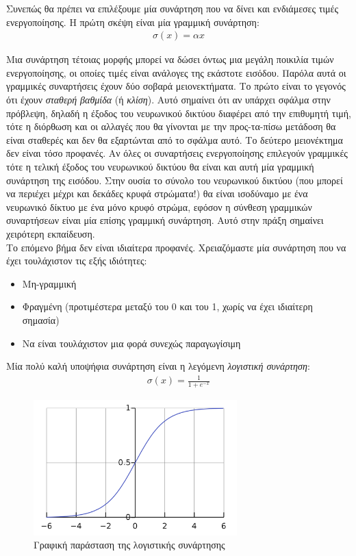 \documentclass[11pt]{article} %
\numberwithin{equation}{subsection}
\begin{document}
Συνεπώς θα πρέπει να επιλέξουμε μία συνάρτηση που να δίνει και ενδιάμεσες τιμές ενεργοποίησης. Η πρώτη σκέψη είναι μία γραμμική συνάρτηση:
\begin{align*}
\sigma (x) = \alpha x
\end{align*}

Μια συνάρτηση τέτοιας μορφής μπορεί να δώσει όντως μια μεγάλη ποικιλία τιμών ενεργοποίησης, οι οποίες τιμές είναι ανάλογες της εκάστοτε εισόδου. Παρόλα αυτά οι γραμμικές συναρτήσεις έχουν δύο σοβαρά μειονεκτήματα. Το πρώτο είναι το γεγονός ότι έχουν \textit{σταθερή βαθμίδα} (ή \textit{κλίση}). Αυτό σημαίνει ότι αν υπάρχει σφάλμα στην πρόβλεψη, δηλαδή η έξοδος του νευρωνικού δικτύου διαφέρει από την επιθυμητή τιμή, τότε η διόρθωση και οι αλλαγές που θα γίνονται με την προς-τα-πίσω μετάδοση θα είναι σταθερές και δεν θα εξαρτώνται από το σφάλμα αυτό. Το δεύτερο μειονέκτημα δεν είναι τόσο προφανές. Αν όλες οι συναρτήσεις ενεργοποίησης επιλεγούν γραμμικές τότε η τελική έξοδος του νευρωνικού δικτύου θα είναι και αυτή μία γραμμική συνάρτηση της εισόδου. Στην ουσία το σύνολο του νευρωνικού δικτύου (που μπορεί να περιέχει μέχρι και δεκάδες κρυφά στρώματα!) θα είναι ισοδύναμο με ένα νευρωνικό δίκτυο με ένα μόνο κρυφό στρώμα, εφόσον η σύνθεση γραμμικών συναρτήσεων είναι μία επίσης γραμμική συνάρτηση. Αυτό στην πράξη σημαίνει χειρότερη εκπαίδευση.\\

Το επόμενο βήμα δεν είναι ιδιαίτερα προφανές. Χρειαζόμαστε μία συνάρτηση που να έχει τουλάχιστον τις εξής ιδιότητες:
\begin{itemize}
  \item Μη-γραμμική
  \item Φραγμένη (προτιμέστερα μεταξύ του 0 και του 1, χωρίς να έχει ιδιαίτερη σημασία)
  \item Να είναι τουλάχιστον μια φορά συνεχώς παραγωγίσιμη 
\end{itemize}

Μία πολύ καλή υποψήφια συνάρτηση είναι η λεγόμενη \textit{λογιστική συνάρτηση}:
\begin{align*}
\sigma(x) = \frac{1}{1+e^{-x}}
\end{align*}

\begin{figure}[H]
    \centering
    \includegraphics[width=0.7\textwidth]{logcurve}
    \caption{Γραφική παράσταση της λογιστικής συνάρτησης}
    \label{fig:logistic curve}
\end{figure}
\end{document}
